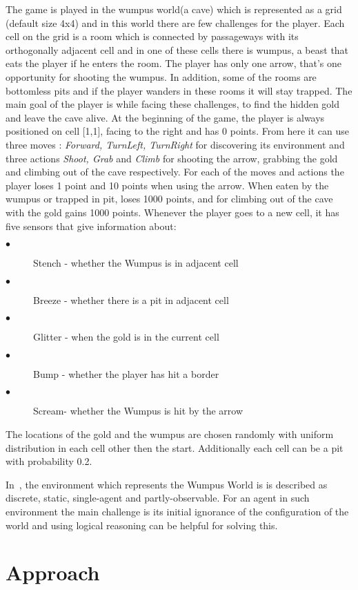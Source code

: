 \documentclass{llncs}
\begin{document}
The game is played in the wumpus world(a cave) which is represented as a grid (default size 4x4) and in this world there are few challenges for the player. Each cell on the grid is a room which is connected by passageways with its orthogonally adjacent cell and in one of these cells there is wumpus, a beast that eats the player if he enters the room. The player has only one arrow, that's one opportunity for shooting the wumpus. In addition, some of the rooms are bottomless pits and if the player wanders in these rooms it will stay trapped. The main goal of the player is while facing these challenges, to find the hidden gold and leave the cave alive. At the beginning of the game, the player is always positioned on cell [1,1], facing to the right and has 0 points. From here it can use three moves : \textit{Forward, TurnLeft, TurnRight} for discovering its environment and three actions \textit{Shoot, Grab} and \textit{ Climb} for shooting the arrow, grabbing the gold and climbing out of the cave respectively. For each of the moves and actions the player loses 1 point and 10 points when using the arrow. When eaten by the wumpus or trapped in pit, loses 1000 points, and for climbing out of the cave with the gold gains 1000 points. Whenever the player goes to a new cell, it has five sensors that give information about:
\begin{description}
	\item [$\bullet$] Stench - whether the Wumpus is in adjacent cell 
	\item [$\bullet$] Breeze - whether there is a pit in adjacent cell	
	\item [$\bullet$] Glitter - when the gold is in the current cell
	\item [$\bullet$] Bump - whether the player has hit a border
	\item [$\bullet$] Scream- whether the Wumpus is hit by the arrow 
\end{description}
The locations of the gold and the wumpus are chosen randomly with uniform distribution in each cell other then the start. Additionally each cell can be a pit with probability 0.2.

In~\cite{book:aima}, the environment which represents the Wumpus World is is described as discrete, static, single-agent and partly-observable. For an agent in such environment the main challenge is its initial ignorance of the configuration of the world and using logical reasoning can be helpful for solving this. 

\section{Approach}
\end{document}
